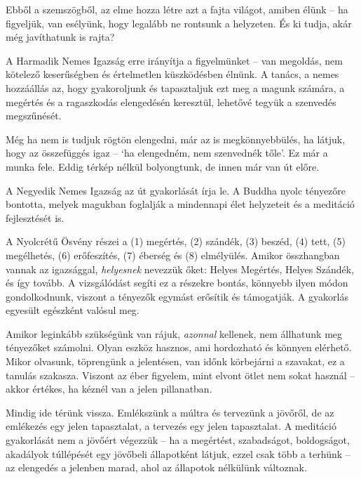 Ebből a szemszögből, az elme hozza létre azt a fajta világot, amiben
élünk -- ha figyeljük, van esélyünk, hogy legalább ne rontsunk a
helyzeten. És ki tudja, akár még javíthatunk is rajta?

A Harmadik Nemes Igazság erre irányítja a figyelmünket -- van megoldás,
nem kötelező keserűségben és értelmetlen küszködésben élnünk. A tanács,
a nemes hozzáállás az, hogy gyakoroljunk és tapasztaljuk ezt meg a
magunk számára, a megértés és a ragaszkodás elengedésén keresztül,
lehetővé tegyük a szenvedés megszűnését.

Még ha nem is tudjuk rögtön elengedni, már az is megkönnyebbülés, ha
látjuk, hogy az összefüggés igaz -- `ha elengedném, nem szenvednék
tőle'. Ez már a munka fele. Eddig térkép nélkül bolyongtunk, de innen
már van út előre.

A Negyedik Nemes Igazság az út gyakorlását írja le. A Buddha nyolc
tényezőre bontotta, melyek magukban foglalják a mindennapi élet
helyzeteit és a meditáció fejlesztését is.

A Nyolcrétű Ösvény részei a (1) megértés, (2) szándék, (3) beszéd, (4)
tett, (5) megélhetés, (6) erőfeszítés, (7) éberség és (8) elmélyülés.
Amikor összhangban vannak az igazsággal, \emph{helyesnek} nevezzük őket:
Helyes Megértés, Helyes Szándék, és így tovább. A vizsgálódást segíti ez
a részekre bontás, könnyebb ilyen módon gondolkodnunk, viszont a
tényezők egymást erősítik és támogatják. A gyakorlás egyesült egészként
valósul meg.

Amikor leginkább szükségünk van rájuk, \emph{azonnal} kellenek, nem
állhatunk meg tényezőket számolni. Olyan eszköz hasznos, ami hordozható
és könnyen elérhető. Mikor olvasunk, töprengünk a jelentésen, van időnk
körbejárni a szavakat, ez a tanulás szakasza. Viszont az éber figyelem,
mint elvont ötlet nem sokat használ -- akkor értékes, ha kéznél van a
jelen pillanatban.

Mindig ide térünk vissza. Emlékszünk a múltra és tervezünk a jövőről, de
az emlékezés egy jelen tapasztalat, a tervezés egy jelen tapasztalat. A
meditáció gyakorlását nem a jövőért végezzük -- ha a megértést,
szabadságot, boldogságot, akadályok túllépését egy jövőbeli állapotként
látjuk, ezzel csak több a terhünk -- az elengedés a jelenben marad, ahol
az állapotok nélkülünk változnak.
